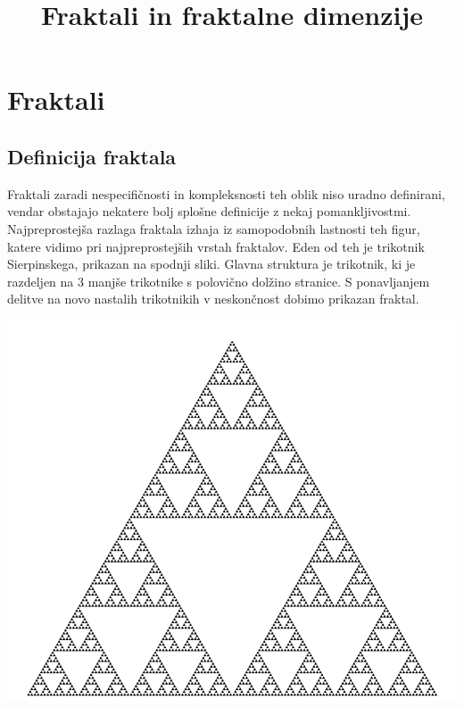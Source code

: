 \documentclass[a4paper, 12px]{article}
\title{Fraktali in fraktalne dimenzije}
\begin{document}
\maketitle
\tableofcontents

\section{Fraktali}
    \subsection{Definicija fraktala}
        Fraktali zaradi nespecifičnosti in kompleksnosti teh oblik niso uradno definirani, vendar obstajajo nekatere bolj splošne definicije z nekaj pomankljivostmi.
        Najpreprostejša razlaga fraktala izhaja iz samopodobnih lastnosti teh figur, katere vidimo pri najpreprostejših vrstah fraktalov. 
        Eden od teh je trikotnik Sierpinskega, prikazan na spodnji sliki. Glavna struktura je trikotnik, ki je razdeljen na 3 manjše trikotnike s polovično dolžino stranice. 
        S ponavljanjem delitve na novo nastalih trikotnikih v neskončnost dobimo prikazan fraktal.
        \cite{FractalDefinitionVideo}
        \cite{FractalDefinition}\\
        \centerline{\includegraphics[scale=0.2]{sierpinski-triangle.png}}
        \begingroup
        \endgroup
\end{document}
